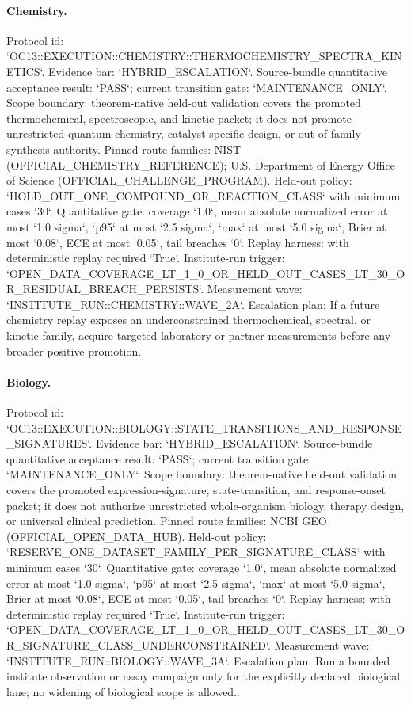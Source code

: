 \paragraph{Chemistry.}
Protocol id: `OC13::EXECUTION::CHEMISTRY::THERMOCHEMISTRY\_SPECTRA\_KINETICS`. Evidence bar: `HYBRID\_ESCALATION`. Source-bundle quantitative acceptance result: `PASS`; current transition gate: `MAINTENANCE\_ONLY`. Scope boundary: theorem-native held-out validation covers the promoted thermochemical, spectroscopic, and kinetic packet; it does not promote unrestricted quantum chemistry, catalyst-specific design, or out-of-family synthesis authority.
Pinned route families: NIST (OFFICIAL\_CHEMISTRY\_REFERENCE); U.S. Department of Energy Office of Science (OFFICIAL\_CHALLENGE\_PROGRAM).
Held-out policy: `HOLD\_OUT\_ONE\_COMPOUND\_OR\_REACTION\_CLASS` with minimum cases `30`.
Quantitative gate: coverage `1.0`, mean absolute normalized error at most `1.0 sigma`, `p95` at most `2.5 sigma`, `max` at most `5.0 sigma`, Brier at most `0.08`, ECE at most `0.05`, tail breaches `0`.
Replay harness:  with deterministic replay required `True`.
Institute-run trigger: `OPEN\_DATA\_COVERAGE\_LT\_1\_0\_OR\_HELD\_OUT\_CASES\_LT\_30\_OR\_RESIDUAL\_BREACH\_PERSISTS`. Measurement wave: `INSTITUTE\_RUN::CHEMISTRY::WAVE\_2A`.
Escalation plan: If a future chemistry replay exposes an underconstrained thermochemical, spectral, or kinetic family, acquire targeted laboratory or partner measurements before any broader positive promotion.

\paragraph{Biology.}
Protocol id: `OC13::EXECUTION::BIOLOGY::STATE\_TRANSITIONS\_AND\_RESPONSE\_SIGNATURES`. Evidence bar: `HYBRID\_ESCALATION`. Source-bundle quantitative acceptance result: `PASS`; current transition gate: `MAINTENANCE\_ONLY`. Scope boundary: theorem-native held-out validation covers the promoted expression-signature, state-transition, and response-onset packet; it does not authorize unrestricted whole-organism biology, therapy design, or universal clinical prediction.
Pinned route families: NCBI GEO (OFFICIAL\_OPEN\_DATA\_HUB).
Held-out policy: `RESERVE\_ONE\_DATASET\_FAMILY\_PER\_SIGNATURE\_CLASS` with minimum cases `30`.
Quantitative gate: coverage `1.0`, mean absolute normalized error at most `1.0 sigma`, `p95` at most `2.5 sigma`, `max` at most `5.0 sigma`, Brier at most `0.08`, ECE at most `0.05`, tail breaches `0`.
Replay harness:  with deterministic replay required `True`.
Institute-run trigger: `OPEN\_DATA\_COVERAGE\_LT\_1\_0\_OR\_HELD\_OUT\_CASES\_LT\_30\_OR\_SIGNATURE\_CLASS\_UNDERCONSTRAINED`. Measurement wave: `INSTITUTE\_RUN::BIOLOGY::WAVE\_3A`.
Escalation plan: Run a bounded institute observation or assay campaign only for the explicitly declared biological lane; no widening of biological scope is allowed..

